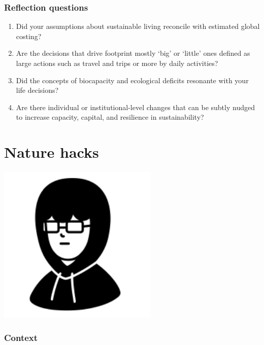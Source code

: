 \documentclass[
]{book}
\providecommand{\tightlist}{%
  \setlength{\itemsep}{0pt}\setlength{\parskip}{0pt}}
\begin{document}
\hypertarget{reflection-questions}{%
\subsection*{Reflection questions}\label{reflection-questions}}

\begin{enumerate}
\def\labelenumi{\arabic{enumi}.}
\tightlist
\item
  Did your assumptions about sustainable living reconcile with estimated global costing?\\
\item
  Are the decisions that drive footprint mostly `big' or `little' ones defined as large actions such as travel and trips or more by daily activities?\\
\item
  Did the concepts of biocapacity and ecological deficits resonante with your life decisions?\\
\item
  Are there individual or institutional-level changes that can be subtly nudged to increase capacity, capital, and resilience in sustainability?
\end{enumerate}

\hypertarget{hacks}{%
\chapter{Nature hacks}\label{hacks}}

\includegraphics[width=3in,height=\textheight]{./hacker.png}

\hypertarget{context-1}{%
\subsection*{Context}\label{context-1}}
\end{document}
